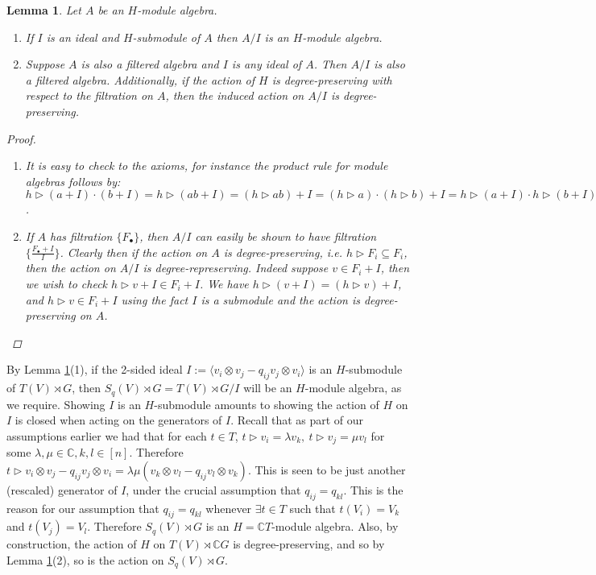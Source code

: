 \documentclass[10pt]{article}
\newcommand{\nt}{\noindent}
\newcommand{\Cc }{\mathbb{C}}
\newcommand{\cd}{\cdot}
\newtheorem{lemma}{Lemma}[section]
\theoremstyle{definition}
\begin{document}
\begin{lemma}\label{quotients_h_mod_algs_result} Let $A$ be an $H$-module algebra. 
\begin{enumerate}
  \item If $I$ is an ideal and $H$-submodule of $A$ then $A/I$ is an $H$-module algebra. 
  \item Suppose $A$ is also a filtered algebra and $I$ is any ideal of $A$. Then $A/I$ is also a filtered algebra. Additionally, if the action of $H$ is degree-preserving with respect to the filtration on $A$, then the induced action on $A/I$ is degree-preserving.
\end{enumerate}
\begin{proof}
\begin{enumerate}
  \item It is easy to check to the axioms, for instance the product rule for module algebras follows by: $h\rhd (a+I)\cd (b+I)=h\rhd (ab+I)=(h\rhd ab)+I=(h\rhd a)\cd (h\rhd b)+I=h\rhd (a+I)\cd h\rhd (b+I)$.%
  \item  If $A$ has filtration $\{F_\bullet\}$, then $A/I$ can easily be shown to have filtration $\{\frac{F_\bullet +I}{I}\}$. Clearly then if the action on $A$ is degree-preserving, i.e. $h\rhd F_i\subseteq F_i$, then the action on $A/I$ is degree-represerving. Indeed suppose $v\in F_i+I$, then we wish to check $h\rhd v+I\in F_i+I$. We have $h\rhd (v+I)=(h\rhd v)+I$, and $h\rhd v\in F_i+I$ using the fact $I$ is a submodule and the action is degree-preserving on $A$.
\end{enumerate}
\end{proof}
\end{lemma}
\nt By Lemma \ref{quotients_h_mod_algs_result}(1), if the 2-sided ideal $I:=\langle  v_i\otimes v_j-q_{ij}v_j\otimes v_i\rangle$ is an $H$-submodule of $T(V)\rtimes G$, then $S_q(V)\rtimes G=T(V)\rtimes G/I$ will be an $H$-module algebra, as we require. Showing $I$ is an $H$-submodule amounts to showing the action of $H$ on $I$ is closed when acting on the generators of $I$. Recall that as part of our assumptions earlier we had that for each $t\in T$, $t\rhd v_i=\lambda v_k,\ t\rhd v_j=\mu v_l$ for some $\lambda,\mu\in \Cc , k,l\in [n]$. Therefore $t\rhd  v_i\otimes v_j-q_{ij}v_j\otimes v_i=\lambda\mu (v_k\otimes v_l-q_{ij}v_l\otimes v_k)$. This is seen to be just another (rescaled) generator of $I$, under the crucial assumption that $q_{ij}=q_{kl}$. This is the reason for our assumption that $q_{ij}=q_{kl}$ whenever $\exists t\in T$ such that $t(V_i)=V_k$ and $t(V_j)=V_l$. Therefore $S_q(V)\rtimes G$ is an $H=\Cc  T$-module algebra. Also, by construction, the action of $H$ on $T(V)\rtimes \Cc  G$ is degree-preserving, and so by Lemma \ref{quotients_h_mod_algs_result}(2), so is the action on $S_q(V)\rtimes G$.
\end{document}
